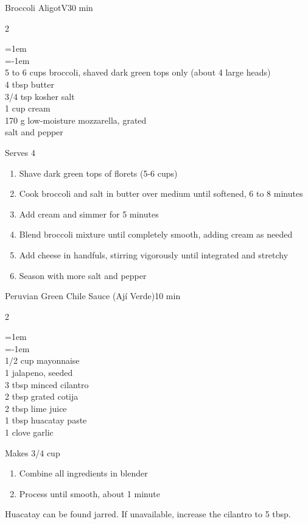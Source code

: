 \documentclass{article}
\newenvironment{recipe}[3][]
    {\begin{cardbase}[#1]{#2}{#3}
    \columnratio{0.333}
    \begin{paracol}{2}}
    {\end{paracol}\end{cardbase}}
\newcommand{\nextcolumn}{\switchcolumn}
\newenvironment{ingredients}
    {
    \begin{obeylines}
    \vspace{\parskip}
    \setlength{\parskip}{0.25em}
    \vspace{-0.25em}
    \leftskip=1em
    \parindent=-1em}
    {\end{obeylines}}
\newenvironment{steps}
    {\begin{enumerate}[leftmargin=*,topsep=0pt]}
    {\end{enumerate}}
\newcommand{\tag}[1]{\hspace{1em}#1}
\newcommand{\symboltag}[2]{\tag{#1\hspace{0.4em}#2}}
\newcommand{\totaltime}[1]{\symboltag{\raisebox{-0.1em}{\small\StopWatchEnd}}{#1}}
\begin{document}
\begin{recipe}{Broccoli Aligot}{\tag{V}\totaltime{30 min}}
\begin{ingredients}
5 to 6 cups broccoli, shaved dark green tops only (about 4 large heads)
4 tbsp butter
3/4 tsp kosher salt
1 cup cream
170 g low-moisture mozzarella, grated
salt and pepper
\end{ingredients}
\nextcolumn
Serves 4
\begin{steps}
    \item Shave dark green tops of florets (5-6 cups)
    \item Cook broccoli and salt in butter over medium until softened, 6 to 8 minutes
    \item Add cream and simmer for 5 minutes
    \item Blend broccoli mixture until completely smooth, adding cream as needed
    \item Add cheese in handfuls, stirring vigorously until integrated and stretchy
    \item Season with more salt and pepper
\end{steps}
\end{recipe}

\begin{recipe}{Peruvian Green Chile Sauce (Ají Verde)}{\totaltime{10 min}}
\begin{ingredients}
1/2 cup mayonnaise
1 jalapeno, seeded
3 tbsp minced cilantro
2 tbsp grated cotija
2 tbsp lime juice
1 tbsp huacatay paste
1 clove garlic
\end{ingredients}
\nextcolumn
Makes 3/4 cup
\begin{steps}
    \item Combine all ingredients in blender
    \item Process until smooth, about 1 minute
\end{steps}
Huacatay can be found jarred. If unavailable, increase the cilantro to 5 tbsp.
\end{recipe}
\end{document}
